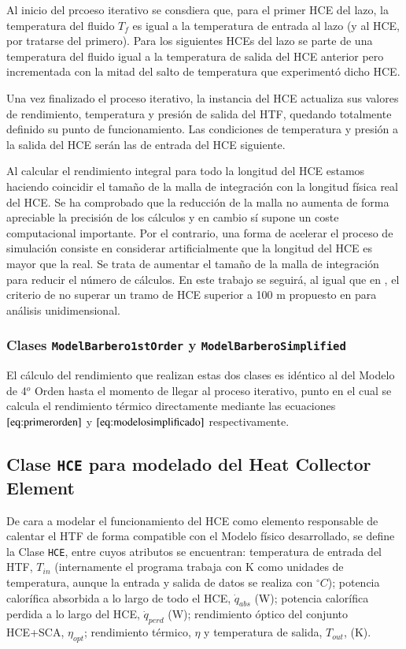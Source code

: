 Al inicio del prcoeso iterativo se consdiera que, para el primer HCE del lazo, la temperatura del fluido \(T_f\) es igual a la temperatura de entrada al lazo (y al HCE, por tratarse del primero). Para los siguientes HCEs del lazo se parte de una temperatura del fluido igual a la temperatura de salida del HCE anterior pero incrementada con la mitad del salto de temperatura que experimentó dicho HCE.

Una vez finalizado el proceso iterativo, la instancia del HCE actualiza sus valores de rendimiento, temperatura y presión de salida del HTF, quedando totalmente definido su punto de funcionamiento. Las condiciones de temperatura y presión a la salida del HCE serán las de entrada del HCE siguiente.

Al calcular el rendimiento integral para todo la longitud del HCE estamos haciendo coincidir el tamaño de la malla de integración con la longitud física real del HCE. Se ha comprobado que la reducción de la malla no aumenta de forma apreciable la precisión de los cálculos y en cambio sí supone un coste computacional importante. Por el contrario, una forma de acelerar el proceso de simulación consiste en considerar artificialmente que la longitud del HCE es mayor que la real. Se trata de aumentar el tamaño de la malla de integración para reducir el número de cálculos. En este trabajo se seguirá, al igual que en \cite{barberofresnoDesarrolloModeloTeorico2018}, el criterio de no superar un tramo de HCE superior a 100 m propuesto en \cite{forristallHeatTransferAnalysis2003} para análisis unidimensional. 

\subsubsection{Clases \texttt{ModelBarbero1stOrder}  y \texttt{ModelBarberoSimplified}}

El cálculo del rendimiento que realizan estas dos clases es idéntico al del Modelo de 4$^o$  Orden hasta el momento de llegar al proceso iterativo, punto en el cual se calcula el rendimiento térmico directamente mediante las ecuaciones  \(\eqref{eq:primerorden}\) y \(\eqref{eq:modelosimplificado}\) respectivamente.


\subsection{Clase \texttt{HCE} para modelado del Heat Collector Element}
\label{heat-collector-element-hce}

De cara a modelar el funcionamiento del HCE como elemento responsable de calentar el HTF de forma compatible con el Modelo físico desarrollado, se define la Clase \texttt{HCE}, entre cuyos atributos se encuentran: temperatura de entrada del HTF, $T_{in}$ (internamente el programa trabaja con K como unidades de temperatura, aunque la entrada y salida de datos se realiza con $^\circ C$); potencia calorífica absorbida a lo largo de todo el HCE, $\dot q_{abs}$ (W); potencia calorífica perdida a lo largo del HCE, $\dot q_{perd}$ (W); rendimiento óptico del conjunto HCE+SCA, $\eta_{opt}$; rendimiento térmico, $\eta$ y temperatura de salida, $T_{out}$, (K). 

